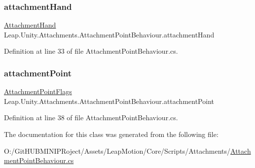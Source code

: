 \subsubsection{\texorpdfstring{attachmentHand}{attachmentHand}}
{\footnotesize\ttfamily \mbox{\hyperlink{class_leap_1_1_unity_1_1_attachments_1_1_attachment_hand}{Attachment\+Hand}} Leap.\+Unity.\+Attachments.\+Attachment\+Point\+Behaviour.\+attachment\+Hand}



Definition at line 33 of file Attachment\+Point\+Behaviour.\+cs.

\mbox{\label{class_leap_1_1_unity_1_1_attachments_1_1_attachment_point_behaviour_a7344e503f10013a48b805d012054f6a1}} 
\subsubsection{\texorpdfstring{attachmentPoint}{attachmentPoint}}
{\footnotesize\ttfamily \mbox{\hyperlink{namespace_leap_1_1_unity_1_1_attachments_a4b32b38f722ad110fcd5a817256e09ab}{Attachment\+Point\+Flags}} Leap.\+Unity.\+Attachments.\+Attachment\+Point\+Behaviour.\+attachment\+Point}



Definition at line 38 of file Attachment\+Point\+Behaviour.\+cs.



The documentation for this class was generated from the following file\+:\begin{DoxyCompactItemize}
\item 
O\+:/\+Git\+H\+U\+B\+M\+I\+N\+I\+P\+Roject/\+Assets/\+Leap\+Motion/\+Core/\+Scripts/\+Attachments/\mbox{\hyperlink{_attachment_point_behaviour_8cs}{Attachment\+Point\+Behaviour.\+cs}}\end{DoxyCompactItemize}
